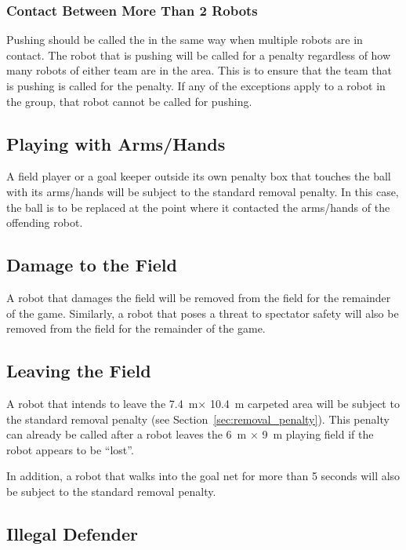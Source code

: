 \documentclass[12pt]{article}
\newcommand{\TotalWidth}{7.4~m\xspace}
\newcommand{\TotalLength}{10.4~m\xspace }
\begin{document}
\subsubsection{Contact Between More Than 2 Robots}
\label{sec:pushing_several_robots}

Pushing should be called the in the same way when multiple robots are in contact. The robot that is pushing will be called for a penalty regardless of how many robots of either team are in the area. This is to ensure that the team that is pushing is called for the penalty. If any of the exceptions apply to a robot in the group, that robot cannot be called for pushing.

\subsection{Playing with Arms/Hands}
\label{sec:hand_ball}

A field player or a goal keeper outside its own penalty box that touches the ball with its arms/hands will be subject to the standard removal penalty. In this case, the ball is to be replaced at the point where it contacted the arms/hands of the offending robot.

\subsection{Damage to the Field}
\label{sec:damage}
A robot that damages the field will be removed from the field for the remainder of the game. Similarly, a robot that poses a threat to spectator safety will also be removed from the field for the remainder of the game.

\subsection{Leaving the Field}
\label{sec:leaving_field}

A robot that intends to leave the \TotalWidth $\times$ \TotalLength carpeted area will be subject to the standard removal penalty (see
Section~\ref{sec:removal_penalty}). This penalty can already be called after a robot leaves the 6~m $\times$ 9~m playing field if the robot appears to be ``lost''.

In addition, a robot that walks into the goal net for more than 5 seconds will also be subject to the standard removal penalty.

\subsection{Illegal Defender}
\label{sec:illegal_defender}
\end{document}

